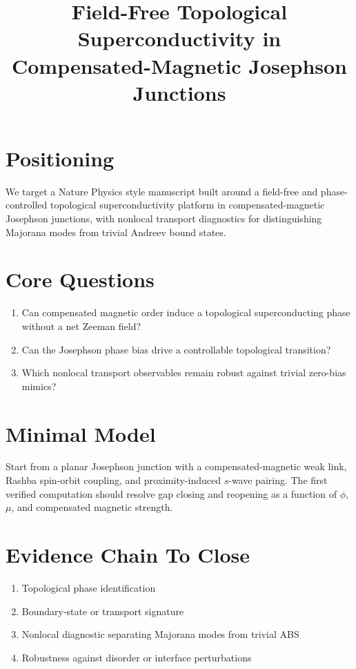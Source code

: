 \documentclass[11pt]{article}
\title{Field-Free Topological Superconductivity in Compensated-Magnetic Josephson Junctions}
\author{}
\date{}
\begin{document}
\maketitle

\section*{Positioning}
We target a Nature Physics style manuscript built around a field-free and phase-controlled topological superconductivity platform in compensated-magnetic Josephson junctions, with nonlocal transport diagnostics for distinguishing Majorana modes from trivial Andreev bound states.

\section*{Core Questions}
\begin{enumerate}
  \item Can compensated magnetic order induce a topological superconducting phase without a net Zeeman field?
  \item Can the Josephson phase bias drive a controllable topological transition?
  \item Which nonlocal transport observables remain robust against trivial zero-bias mimics?
\end{enumerate}

\section*{Minimal Model}
Start from a planar Josephson junction with a compensated-magnetic weak link, Rashba spin-orbit coupling, and proximity-induced $s$-wave pairing. The first verified computation should resolve gap closing and reopening as a function of $\phi$, $\mu$, and compensated magnetic strength.

\section*{Evidence Chain To Close}
\begin{enumerate}
  \item Topological phase identification
  \item Boundary-state or transport signature
  \item Nonlocal diagnostic separating Majorana modes from trivial ABS
  \item Robustness against disorder or interface perturbations
\end{enumerate}
\end{document}
